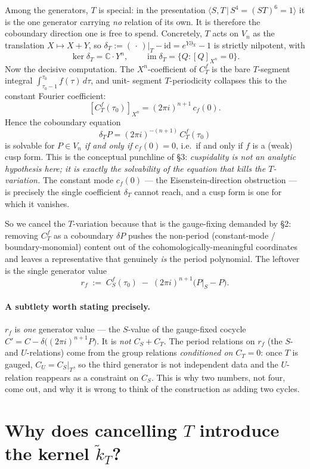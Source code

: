 \documentclass[11pt]{article}
\newcommand{\CC}{\mathbb{C}}
\newcommand{\ktil}{\widetilde{k}_T}
\theoremstyle{plain}
\begin{document}
Among the generators, $T$ is special: in the presentation
$\langle S,T\,|\,S^4=(ST)^6=1\rangle$ it is the one generator carrying
\emph{no} relation of its own. It is therefore the coboundary direction one
is free to spend. Concretely, $T$ acts on $V_n$ as the translation
$X\mapsto X+Y$, so $\delta_T:=(\,\cdot\,)|_T-\mathrm{id}=e^{Y\partial_X}-1$
is strictly nilpotent, with
\[
  \ker\delta_T=\CC\cdot Y^n,
  \qquad
  \operatorname{im}\delta_T=\{Q:[Q]_{X^n}=0\}.
\]
Now the decisive computation. The $X^n$-coefficient of $C^f_T$ is the bare
$T$-segment integral $\int_{\tau_0-1}^{\tau_0} f(\tau)\,d\tau$, and unit-
segment $T$-periodicity collapses this to the constant Fourier coefficient:
\[
  [C^f_T(\tau_0)]_{X^n}=(2\pi i)^{n+1}\,c_f(0).
\]
Hence the coboundary equation
\[
  \boxed{\;\delta_T P = (2\pi i)^{-(n+1)}\,C^f_T(\tau_0)\;}
\]
is solvable for $P\in V_n$ \emph{if and only if} $c_f(0)=0$, i.e.\ if and
only if $f$ is a (weak) cusp form. This is the conceptual punchline of \S3:
\emph{cuspidality is not an analytic hypothesis here; it is exactly the
solvability of the equation that kills the $T$-variation.} The constant
mode $c_f(0)$ --- the Eisenstein-direction obstruction --- is precisely the
single coefficient $\delta_T$ cannot reach, and a cusp form is one for which
it vanishes.

So we cancel the $T$-variation because that is the gauge-fixing demanded by
\S2: removing $C^f_T$ as a coboundary $\delta P$ pushes the non-period
(constant-mode / boundary-monomial) content out of the
cohomologically-meaningful coordinates and leaves a representative that
genuinely \emph{is} the period polynomial. The leftover is the single
generator value
\[
  r_f \;:=\; C^f_S(\tau_0)\;-\;(2\pi i)^{n+1}\big(P|_S-P\big).
\]

\paragraph{A subtlety worth stating precisely.}
$r_f$ is \emph{one} generator value --- the $S$-value of the gauge-fixed
cocycle $C'=C-\delta\big((2\pi i)^{n+1}P\big)$. It is \emph{not}
$C_S+C_T$. The period relations on $r_f$ (the $S$- and $U$-relations) come
from the group relations \emph{conditioned on} $C_T=0$: once $T$ is gauged,
$C_U=C_S|_T$, so the third generator is not independent data and the
$U$-relation reappears as a constraint on $C_S$. This is why two numbers,
not four, come out, and why it is wrong to think of the construction as
adding two cycles.

\section{Why does cancelling $T$ introduce the kernel $\ktil$?}
\end{document}
